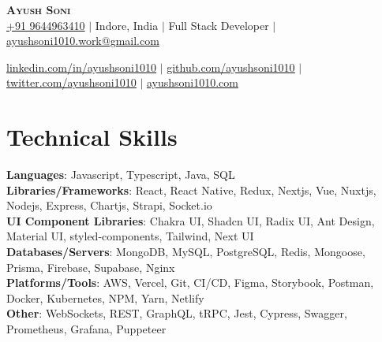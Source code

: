 \documentclass[letterpaper,11pt]{article}
\begin{document}

\begin{center}
\textbf{\Huge \scshape Ayush Soni} \\ \vspace{10pt}
\href{tel:9644963410}{+91 9644963410} $|$
{Indore, India} $|$
{Full Stack Developer} $|$
\href{mailto:ayushsoni1010.work@gmail.com}{ayushsoni1010.work@gmail.com} \\ \vspace{3pt}

\href{https://linkedin.com/in/ayushsoni1010}{\underline{linkedin.com/in/ayushsoni1010}} $|$
\href{https://github.com/ayushsoni1010}{\underline{github.com/ayushsoni1010}} $|$
\href{https://twitter.com/ayushsoni1010}{\underline{twitter.com/ayushsoni1010}} $|$
\href{https://ayushsoni1010.com}{\underline{ayushsoni1010.com}}
\end{center}



\section{Technical Skills}
\begin{itemize}[leftmargin=0.15in, label={}]
\small{\item{
      \textbf{Languages}{: \hfill Javascript, Typescript, Java, SQL } \\
      \vspace{3pt}\textbf{Libraries/Frameworks}{: \hfill React, React Native, Redux, Nextjs, Vue, Nuxtjs, Nodejs, Express, Chartjs, Strapi, Socket.io} \\
      \vspace{3pt}\textbf{UI Component Libraries}{: \hfill Chakra UI, Shadcn UI, Radix UI, Ant Design, Material UI, styled-components, Tailwind, Next UI} \\
      \vspace{3pt}\textbf{Databases/Servers}{: \hfill MongoDB, MySQL, PostgreSQL, Redis, Mongoose, Prisma, Firebase, Supabase, Nginx} \\
      \vspace{3pt}\textbf{Platforms/Tools}{: \hfill AWS, Vercel, Git, CI/CD, Figma, Storybook, Postman, Docker, Kubernetes, NPM, Yarn, Netlify } \\
      \vspace{3pt}\textbf{Other}{: \hfill WebSockets, REST, GraphQL, tRPC, Jest, Cypress, Swagger, Prometheus, Grafana, Puppeteer }
      }}
\end{itemize}
\end{document}
